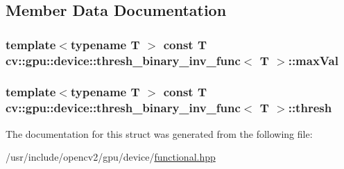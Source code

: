 \subsection{Member Data Documentation}
\hypertarget{structcv_1_1gpu_1_1device_1_1thresh__binary__inv__func_a415a9017afbd1924896771cc528661d5}{
\subsubsection[{max\-Val}]{\setlength{\rightskip}{0pt plus 5cm}template$<$typename T $>$ const {\bf T} {\bf cv\-::gpu\-::device\-::thresh\-\_\-binary\-\_\-inv\-\_\-func}$<$ {\bf T} $>$\-::max\-Val}}\label{structcv_1_1gpu_1_1device_1_1thresh__binary__inv__func_a415a9017afbd1924896771cc528661d5}
\hypertarget{structcv_1_1gpu_1_1device_1_1thresh__binary__inv__func_ac4153ad8d75322366054f358046278cd}{
\subsubsection[{thresh}]{\setlength{\rightskip}{0pt plus 5cm}template$<$typename T $>$ const {\bf T} {\bf cv\-::gpu\-::device\-::thresh\-\_\-binary\-\_\-inv\-\_\-func}$<$ {\bf T} $>$\-::thresh}}\label{structcv_1_1gpu_1_1device_1_1thresh__binary__inv__func_ac4153ad8d75322366054f358046278cd}


The documentation for this struct was generated from the following file\-:\begin{DoxyCompactItemize}
\item 
/usr/include/opencv2/gpu/device/\hyperlink{functional_8hpp}{functional.\-hpp}\end{DoxyCompactItemize}
